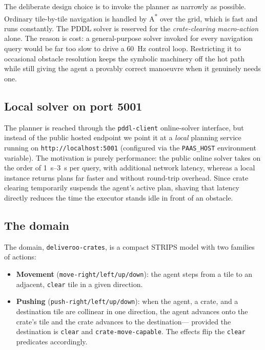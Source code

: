 \documentclass[a4paper,11pt]{article}
\begin{document}
The deliberate design choice is to invoke the planner as narrowly as possible.
Ordinary tile-by-tile navigation is handled by A\textsuperscript{*} over the grid,
which is fast and runs constantly. The PDDL solver is reserved for the
\emph{crate-clearing macro-action} alone. The reason is cost: a general-purpose
solver invoked for every navigation query would be far too slow to drive a
\SI{60}{\hertz} control loop. Restricting it to occasional obstacle resolution
keeps the symbolic machinery off the hot path while still giving the agent a
provably correct manoeuvre when it genuinely needs one.

\subsection{Local solver on port 5001}

The planner is reached through the \texttt{pddl-client} online-solver interface,
but instead of the public hosted endpoint we point it at a \emph{local} planning
service running on \texttt{http://localhost:5001} (configured via the
\texttt{PAAS\_HOST} environment variable). The motivation is purely performance:
the public online solver takes on the order of
\SIrange{1}{3}{\second} per query, with additional network latency, whereas a local
instance returns plans far faster and without round-trip overhead. Since crate
clearing temporarily suspends the agent's active plan, shaving that latency
directly reduces the time the executor stands idle in front of an obstacle.

\subsection{The domain}

The domain, \texttt{deliveroo-crates}, is a compact STRIPS model with two families
of actions:

\begin{itemize}
  \item \textbf{Movement} (\texttt{move-right/left/up/down}): the agent steps from
        a tile to an adjacent, \texttt{clear} tile in a given direction.
  \item \textbf{Pushing} (\texttt{push-right/left/up/down}): when the agent, a
        crate, and a destination tile are collinear in one direction, the agent
        advances onto the crate's tile and the crate advances to the destination---
        provided the destination is \texttt{clear} and \texttt{crate-move-capable}.
        The effects flip the \texttt{clear} predicates accordingly.
\end{itemize}
\end{document}

